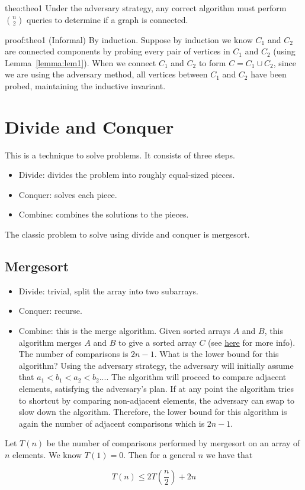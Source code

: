 \begin{theo}[]{theo:theo1}
Under the adversary strategy, any correct
algorithm must perform $\binom{n}{2}$ queries to determine if
a graph is connected. 
\end{theo}

\begin{prf}[]{proof:theo1}
(Informal) By induction. Suppose by induction we know $C_1$ and $C_2$
are connected components by probing every pair of vertices in $C_1$
and $C_2$ (using Lemma~\ref{lemma:lem1}). When we connect $C_1$ and
$C_2$ to form $C = C_1 \cup C_2$, since we are using the adversary
method, all vertices between $C_1$ and $C_2$ have been probed,
maintaining the inductive invariant.
\end{prf}

\section{Divide and Conquer}

This is a technique to solve problems. It consists of three steps.

\begin{itemize}
    \item Divide: divides the problem into roughly equal-sized pieces.
    \item Conquer: solves each piece.
    \item Combine: combines the solutions to the pieces.
\end{itemize}

The classic problem to solve using divide and conquer is mergesort.

\subsection{Mergesort}

\begin{itemize}
    \item Divide: trivial, split the array into two subarrays.
    \item Conquer: recurse.
    \item Combine: this is the merge algorithm. Given sorted arrays
    $A$ and $B$, this algorithm merges $A$ and $B$ to give a sorted
    array $C$ (see 
    \href{https://en.wikipedia.org/wiki/Merge_algorithm}{here} for
    more info). The number of comparisons is $2n - 1$. What is the
    lower bound for this algorithm? Using the adversary strategy, the
    adversary will initially assume that $a_1 < b_1 < a_2 < b_2 ...$.
    The algorithm will proceed to compare adjacent elements,
    satisfying the adversary's plan. If at any point the algorithm
    tries to shortcut by comparing non-adjacent elements, the
    adversary can swap to slow down the algorithm. Therefore, the
    lower bound for this algorithm is again the number of adjacent
    comparisons which is $2n - 1$.
\end{itemize}


Let $T(n)$ be the number of comparisons performed by mergesort on
an array of $n$ elements. We know $T(1) = 0$. Then for a general $n$
we have that

$$T(n) \leq 2T(\frac{n}{2}) + 2n$$




